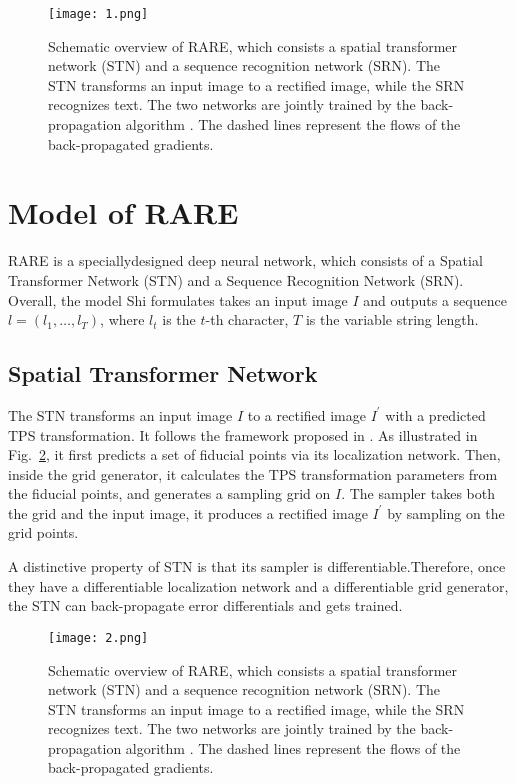 \documentclass[10pt,twocolumn,letterpaper]{article}
\begin{document}
\begin{figure}
	\begin{center}
		\texttt{[image: 1.png]}
	\end{center}
	\caption{Schematic overview of RARE, which consists a spatial transformer network (STN) and a sequence recognition network (SRN). The STN transforms an input image to a rectified image, while the SRN recognizes text. The two networks are jointly trained by the back-propagation algorithm \cite{lecun1998gradient}. The dashed lines represent the flows of the back-propagated gradients.}
	\label{fig:1}
\end{figure}

\section{Model of RARE}

RARE is a speciallydesigned deep neural network, which consists of a Spatial Transformer Network (STN) and a Sequence Recognition Network (SRN). Overall, the model Shi formulates takes an input image $I$ and outputs a sequence $l = (l_1,\dots,l_T )$, where $l_t$ is the $t$-th character, $T$ is the variable string length.

\subsection{Spatial Transformer Network}

The STN transforms an input image $I$ to a rectified image $I^\prime$ with a predicted TPS transformation. It follows the framework proposed in \cite{jaderberg2015spatial}. As illustrated in Fig.~\ref{fig:2}, it first predicts a set of fiducial points via its localization network. Then, inside the grid generator, it calculates the TPS transformation parameters from the fiducial points, and generates a sampling grid on $I$. The sampler takes both the grid and the input image, it produces a rectified image $I^\prime$ by sampling on the grid points. 

A distinctive property of STN is that its sampler is differentiable.Therefore, once they have a differentiable localization network and a differentiable grid generator, the STN can back-propagate error differentials and gets trained.

\begin{figure}
	\begin{center}
		\texttt{[image: 2.png]}
	\end{center}
	\caption{Schematic overview of RARE, which consists a spatial transformer network (STN) and a sequence recognition network (SRN). The STN transforms an input image to a rectified image, while the SRN recognizes text. The two networks are jointly trained by the back-propagation algorithm \cite{lecun1998gradient}. The dashed lines represent the flows of the back-propagated gradients.}
	\label{fig:2}
\end{figure}
\end{document}
